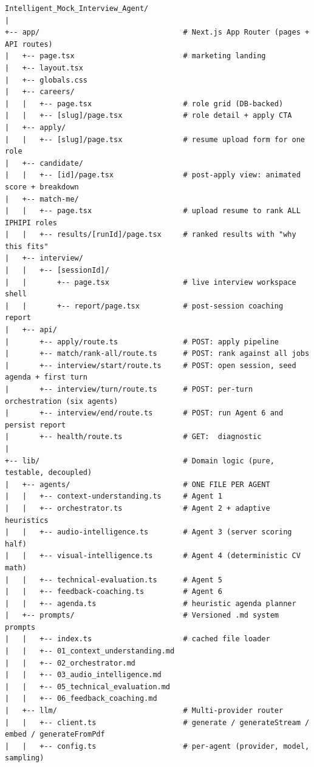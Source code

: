 \documentclass[11pt,a4paper]{article}
\begin{document}
\begin{lstlisting}[basicstyle=\ttfamily\scriptsize]
Intelligent_Mock_Interview_Agent/
|
+-- app/                                 # Next.js App Router (pages + API routes)
|   +-- page.tsx                         # marketing landing
|   +-- layout.tsx
|   +-- globals.css
|   +-- careers/
|   |   +-- page.tsx                     # role grid (DB-backed)
|   |   +-- [slug]/page.tsx              # role detail + apply CTA
|   +-- apply/
|   |   +-- [slug]/page.tsx              # resume upload form for one role
|   +-- candidate/
|   |   +-- [id]/page.tsx                # post-apply view: animated score + breakdown
|   +-- match-me/
|   |   +-- page.tsx                     # upload resume to rank ALL IPHIPI roles
|   |   +-- results/[runId]/page.tsx     # ranked results with "why this fits"
|   +-- interview/
|   |   +-- [sessionId]/
|   |       +-- page.tsx                 # live interview workspace shell
|   |       +-- report/page.tsx          # post-session coaching report
|   +-- api/
|       +-- apply/route.ts               # POST: apply pipeline
|       +-- match/rank-all/route.ts      # POST: rank against all jobs
|       +-- interview/start/route.ts     # POST: open session, seed agenda + first turn
|       +-- interview/turn/route.ts      # POST: per-turn orchestration (six agents)
|       +-- interview/end/route.ts       # POST: run Agent 6 and persist report
|       +-- health/route.ts              # GET:  diagnostic
|
+-- lib/                                 # Domain logic (pure, testable, decoupled)
|   +-- agents/                          # ONE FILE PER AGENT
|   |   +-- context-understanding.ts     # Agent 1
|   |   +-- orchestrator.ts              # Agent 2 + adaptive heuristics
|   |   +-- audio-intelligence.ts        # Agent 3 (server scoring half)
|   |   +-- visual-intelligence.ts       # Agent 4 (deterministic CV math)
|   |   +-- technical-evaluation.ts      # Agent 5
|   |   +-- feedback-coaching.ts         # Agent 6
|   |   +-- agenda.ts                    # heuristic agenda planner
|   +-- prompts/                         # Versioned .md system prompts
|   |   +-- index.ts                     # cached file loader
|   |   +-- 01_context_understanding.md
|   |   +-- 02_orchestrator.md
|   |   +-- 03_audio_intelligence.md
|   |   +-- 05_technical_evaluation.md
|   |   +-- 06_feedback_coaching.md
|   +-- llm/                             # Multi-provider router
|   |   +-- client.ts                    # generate / generateStream / embed / generateFromPdf
|   |   +-- config.ts                    # per-agent (provider, model, sampling)

\end{lstlisting}
\end{document}

